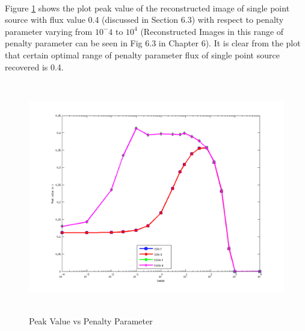 \paragraph{}Figure \ref{Figflux} shows the plot peak value of the reconstructed image of 
single point source with flux value 0.4 (discussed in Section 6.3) with respect to penalty parameter varying from $10^-4$
to $10^4$ (Reconstructed Images in this range of penalty parameter can be seen in Fig 6.3 in 
Chapter 6). It is clear from the plot that certain optimal range of penalty parameter flux of 
single point source recovered is 0.4. 


\begin{figure}[!htbp]
  \begin{center}
      \includegraphics[width=6.1in,height=4in]{figures/pv}
    \caption{Peak Value vs Penalty Parameter}
    \label{Figflux}
  \end{center}
\end{figure}
